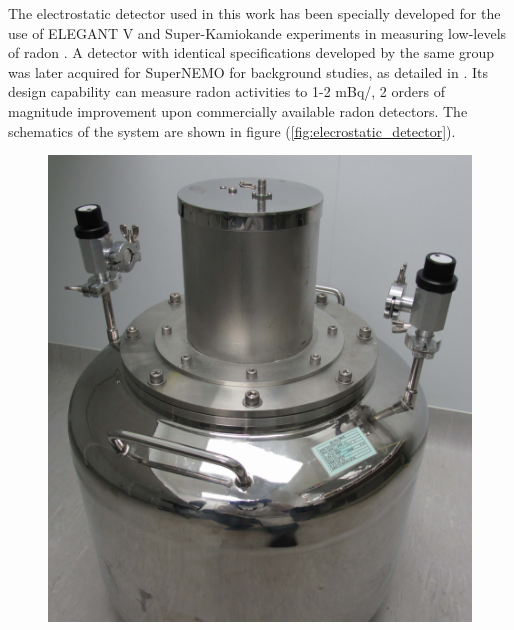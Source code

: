 The electrostatic detector used in this work has been specially developed for the use of ELEGANT V and Super-Kamiokande experiments in measuring low-levels of radon \cite{CHOI2001177, MITSUDA2003414}. A detector with identical specifications developed by the same group was later acquired for SuperNEMO for background studies, as detailed in \cite{mott_2013}. Its design capability can measure radon activities to 1-2 mBq/\cubicmeter{}, 2 orders of magnitude improvement upon commercially available radon detectors. The schematics of the system are shown in figure (\ref{fig:elecrostatic_detector}). 
%
\begin{figure}[h!]
    \centering
    \includegraphics[scale=0.3]{Chapter_4/Figures/electrostatic_detector_1.png}

\end{figure}
